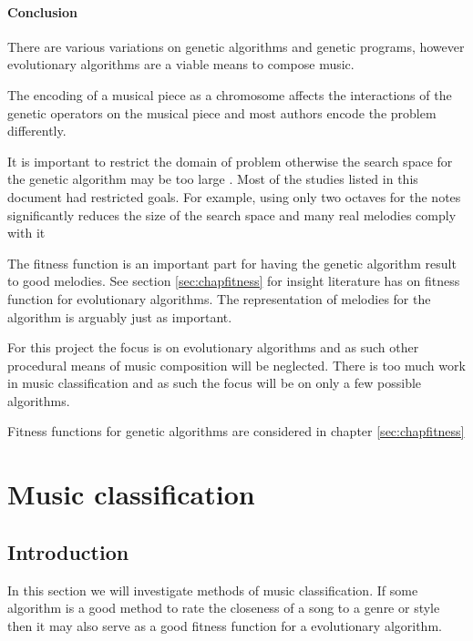 \subsubsection{Conclusion}
There are various variations on genetic algorithms and genetic programs, however evolutionary algorithms are a viable means to compose music.

The encoding of a musical piece as a chromosome affects the interactions of the genetic operators on the musical piece and most authors encode the problem differently.

It is important to restrict the domain of problem otherwise the search space for the genetic algorithm may be too large \cite{Jacob1995}. Most of the studies listed in this document had restricted goals.
For example, using only two octaves for the notes significantly reduces the size of the search space and many real melodies comply with it \cite{Alfonseca2007}

The fitness function is an important part for having the genetic algorithm result to good melodies. See section \ref{sec:chapfitness} for insight literature has on fitness function for evolutionary algorithms.
The representation of melodies for the algorithm is arguably just as important.

For this project the focus is on evolutionary algorithms and as such other procedural means of music composition will be neglected. There is too much work in music classification and as such the focus will be on only a few possible algorithms.

Fitness functions for genetic algorithms are considered in chapter \ref{sec:chapfitness}



\chapter{Music classification} \label{sec:music_class}
\section{Introduction}
In this section we will investigate methods of music classification. If some algorithm is a good method to rate the closeness of a song to a genre or style then it may also serve as a good fitness function for a evolutionary algorithm.


